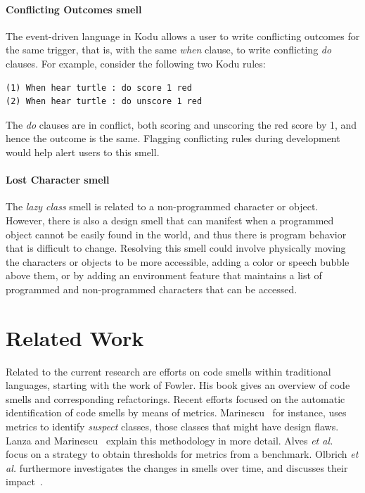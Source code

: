 \documentclass{sig-alternate}
\begin{document}
\paragraph{Conflicting Outcomes smell}
The event-driven language in Kodu allows a user to write conflicting outcomes for the same trigger, that is, with the same \emph{when} clause, to write conflicting \emph{do} clauses. For example, consider the following two Kodu rules:
\begin{verbatim}
(1) When hear turtle : do score 1 red
(2) When hear turtle : do unscore 1 red
\end{verbatim}
\noindent The \emph{do} clauses are in conflict, both scoring and unscoring the red score by 1, and hence the outcome is the same. Flagging conflicting rules during development would help alert users to this smell. 


\paragraph{Lost Character smell}
The \emph{lazy class} smell is related to a non-programmed character or object. However, there is also a design smell that can manifest when a programmed object cannot be easily found in the world, and thus there is program behavior that is difficult to change. Resolving this smell could involve physically moving the characters or objects to be more accessible, adding a color or speech bubble above them, or by adding an environment feature that maintains a list of programmed and non-programmed characters that can be accessed. 	

\section{Related Work}

\label{sec:related_work}
Related to the current research are efforts on code smells within traditional languages, starting with the work of Fowler\cite{Fowl1999}. His book gives an overview of code smells and corresponding refactorings. Recent efforts focused on the automatic identification of code smells by means of metrics. Marinescu~\cite{Mari2001} for instance, uses metrics to identify \emph{suspect} classes, those classes that might have design flaws. Lanza and Marinescu~\cite{Lanz06} explain this methodology in more detail. Alves \emph{et al.}~\cite{Alves2010} focus on a strategy to obtain thresholds for metrics from a benchmark. Olbrich \emph{et al.} furthermore investigates the changes in smells over time, and discusses their impact~\cite{Olbr2009}.
\end{document}
